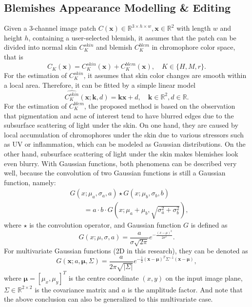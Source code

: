 \begin{spacing}{1.5}
\section{Blemishes Appearance Modelling \& Editing}
Given a 3-channel image patch $C(\mathbf{x})\in\mathbb{R}^{3\times h\times w}, \mathbf{x}\in\mathbb{R}^2$ with length $w$ and height $h$, containing a user-selected blemish, it assumes that the patch can be divided into normal skin $C_K^{skin}$ and blemish $C_K^{blem}$ in chromophore color space, that is
\begin{equation}
  C_K(\mathbf{x}) = C_K^{skin}(\mathbf{x}) + C_K^{blem}(\mathbf{x}),\quad K\in\{H,M,r\}.
\end{equation}
For the estimation of $C_K^{skin}$, it assumes that skin color changes are smooth within a local area. Therefore, it can be fitted by a simple linear model
\begin{equation}
  \hat{C_K^{skin}}(\mathbf{x};\mathbf{k},d)=\mathbf{k}\mathbf{x}+d,\quad\mathbf{k}\in\mathbb{R}^2, d\in\mathbb{R}.
\end{equation}
For the estimation of $C_K^{blem}$, the proposed method is based on the observation that pigmentation and acne of interest tend to have blurred edges due to the subsurface scattering of light under the skin. On one hand, they are caused by local accumulation of chromophores under the skin due to various stressors such as UV or inflammation, which can be modeled as Gaussian distributions. On the other hand, subsurface scattering of light under the skin makes blemishes look even blurry. With Gaussian functions, both phenomena can be described very well, because the convolution of two Gaussian functions is still a Gaussian function, namely:
\begin{equation}
    \begin{aligned}
         & G(x; \mu_a, \sigma_a, a)\star G(x; \mu_b, \sigma_b, b)                 \\
         & \qquad= a\cdot b\cdot G(x; \mu_a+\mu_b, \sqrt{\sigma_a^2+\sigma_b^2}),
    \end{aligned}
\end{equation}
where $\star$ is the convolution operator, and Gaussian function $G$ is defined as
\begin{equation}
    G(x; \mu, \sigma, a) = \frac{a}{\sigma\sqrt{2\pi}}e^{-\frac{{(x - \mu)^2}}{{2\sigma^2}}}.
\end{equation}
For multivariate Gaussian functions (2D in this research), they can be denoted as
\begin{equation}
    G(\mathbf{x}; a, \mathbf{\mu}, \Sigma)=\frac{a}{2\pi\sqrt{|\Sigma|}}e^{-\frac{1}{2}(\mathbf{x}-\mathbf{\mu})^T\Sigma^{-1}(\mathbf{x}-\mathbf{\mu})},
  \end{equation}
where $\mathbf{\mu}=[\mu_x,\mu_y]^T$ is the centre coordinate $(x,y)$ on the input image plane, $\Sigma\in\mathbb{R}^{2\times2}$ is the covariance matrix and $a$ is the amplitude factor. And note that the above conclusion can also be generalized to this multivariate case.


\end{spacing}
